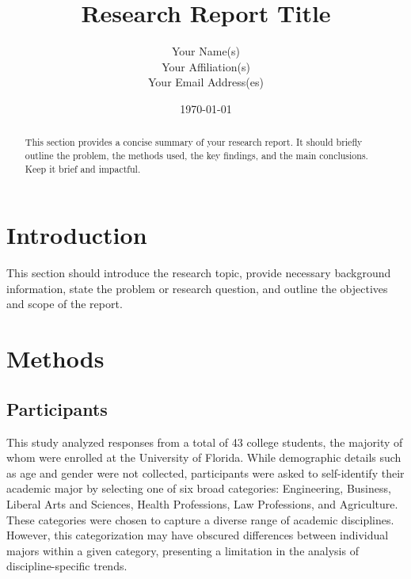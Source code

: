 \documentclass[12pt]{article}
\title{Research Report Title}
\author{Your Name(s) \\ Your Affiliation(s) \\ Your Email Address(es)}
\date{\today}
\begin{document}
\maketitle
\begin{abstract}
This section provides a concise summary of your research report. It should briefly outline the problem, the methods used, the key findings, and the main conclusions. Keep it brief and impactful.
\end{abstract}

\tableofcontents
\newpage

\section{Introduction}
\label{sec:introduction}
This section should introduce the research topic, provide necessary background information, state the problem or research question, and outline the objectives and scope of the report.

\section{Methods}
\label{sec:methods}

\subsection{Participants}
\label{subsec:participants}
This study analyzed responses from a total of 43 college students, the majority of whom were enrolled at the University of Florida. While demographic details such as age and gender were not collected, participants were asked to self-identify their academic major by selecting one of six broad categories: Engineering, Business, Liberal Arts and Sciences, Health Professions, Law Professions, and Agriculture. These categories were chosen to capture a diverse range of academic disciplines. However, this categorization may have obscured differences between individual majors within a given category, presenting a limitation in the analysis of discipline-specific trends.
\end{document}
